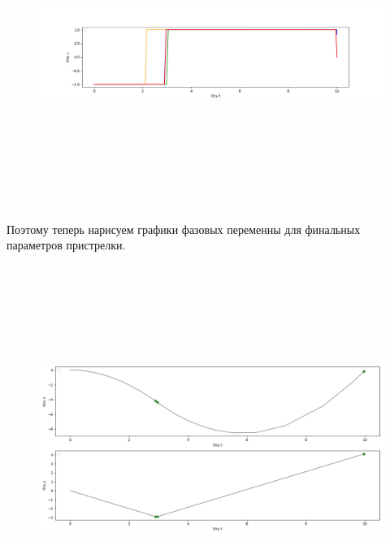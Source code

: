 \documentclass[a4paper,12pt]{article}
\begin{document}
\begin{figure}[H]
    \centering
      \includegraphics[width=\textwidth, height=10cm]{Figure_3.png}
\end{figure}
Поэтому теперь нарисуем графики фазовых переменны для финальных параметров пристрелки.
\begin{figure}[H]
    \centering
      \includegraphics[width=\textwidth, height=12cm]{Figure1_1.png}
\end{figure}
\end{document}
